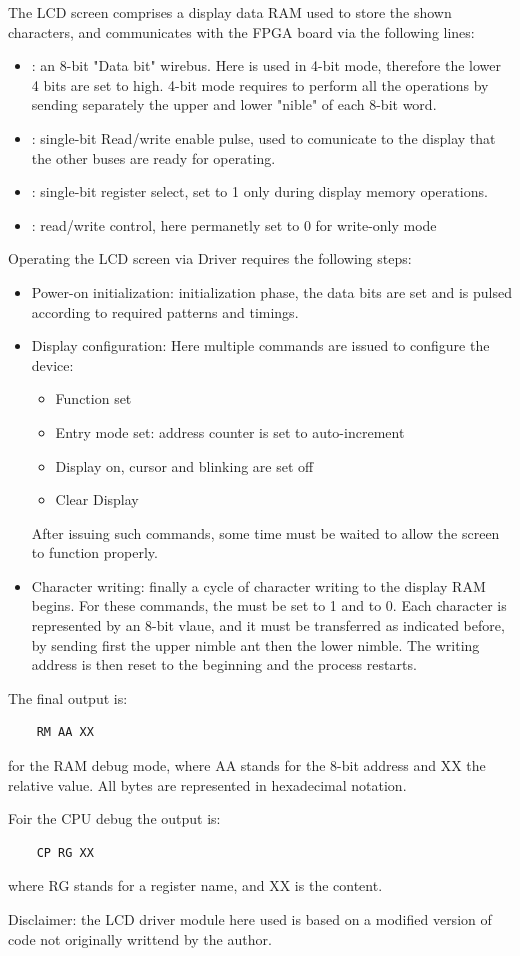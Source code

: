 The LCD screen comprises a display data RAM used to store the shown characters,
and communicates with the FPGA board via the following lines:
\begin{itemize}
    \item {}: an 8-bit "Data bit" wirebus. Here is used in 4-bit mode, therefore the lower 4 bits are set to high. 
    4-bit mode requires to perform all the operations by sending separately the upper and lower "nible" of each 8-bit word.
    \item {}: single-bit Read/write enable pulse, used to comunicate to the display that the other buses are ready for operating.
    \item {}: single-bit register select, set to 1 only during display memory operations.
    \item {}: read/write control, here permanetly set to 0 for write-only mode
\end{itemize}
Operating the LCD screen via Driver \cite{Board} requires the following steps:
\begin{itemize}
    \item Power-on initialization: initialization phase, the data bits are set and  is pulsed according to required patterns and timings.
    \item Display configuration: Here multiple commands are issued to configure the device:
    \begin{itemize}
        \item Function set
        \item Entry mode set: address counter is set to auto-increment
        \item Display on, cursor and blinking are set off
        \item Clear Display
    \end{itemize}
    After issuing such commands, some time must be waited to allow the screen to function properly.
    \item Character writing: finally a cycle of character writing to the display RAM begins. For these commands, the  must be set
    to 1 and  to 0. Each character is represented by an 8-bit vlaue, and it must be transferred as indicated before, by sending first the upper nimble ant then the lower nimble.
    The writing address is then reset to the beginning and the process restarts.
\end{itemize}
The final output is:

\begin{verbatim}
    RM AA XX
\end{verbatim}
for the RAM debug mode, where AA stands for the 8-bit address and XX the relative value.
All bytes are represented in hexadecimal notation.

Foir the CPU debug the output is:
\begin{verbatim}
    CP RG XX
\end{verbatim}
where RG stands for a register name, and XX is the content.

Disclaimer: the LCD driver module here used is based on a modified version of code not originally writtend by the author.